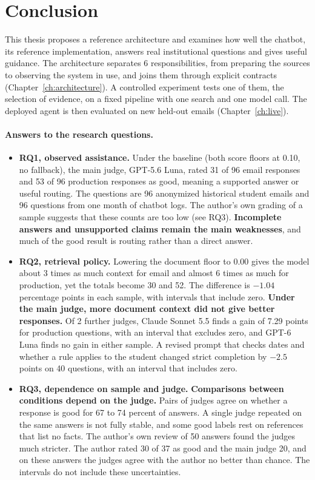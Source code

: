 \section{Conclusion}
\label{ch:conclusion}

This thesis proposes a reference architecture and examines how well the chatbot, its reference implementation, answers real institutional questions and gives useful guidance. The architecture separates 6 responsibilities, from preparing the sources to observing the system in use, and joins them through explicit contracts (Chapter~\ref{ch:architecture}). A controlled experiment tests one of them, the selection of evidence, on a fixed pipeline with one search and one model call. The deployed agent is then evaluated on new held-out emails (Chapter~\ref{ch:live}).

\paragraph{Answers to the research questions.}
\begin{itemize}
  \item \textbf{RQ1, observed assistance.} Under the baseline (both score floors at 0.10, no fallback), the main judge, GPT-5.6 Luna, rated 31 of 96 email responses and 53 of 96 production responses as good, meaning a supported answer or useful routing. The questions are 96 anonymized historical student emails and 96 questions from one month of chatbot logs. The author's own grading of a sample suggests that these counts are too low (see RQ3). \textbf{Incomplete answers and unsupported claims remain the main weaknesses}, and much of the good result is routing rather than a direct answer.
  \item \textbf{RQ2, retrieval policy.} Lowering the document floor to 0.00 gives the model about 3 times as much context for email and almost 6 times as much for production, yet the totals become 30 and 52. The difference is $-1.04$ percentage points in each sample, with intervals that include zero. \textbf{Under the main judge, more document context did not give better responses.} Of 2 further judges, Claude Sonnet 5.5 finds a gain of 7.29 points for production questions, with an interval that excludes zero, and GPT-6 Luna finds no gain in either sample. A revised prompt that checks dates and whether a rule applies to the student changed strict completion by $-2.5$ points on 40 questions, with an interval that includes zero.
  \item \textbf{RQ3, dependence on sample and judge.} \textbf{Comparisons between conditions depend on the judge.} Pairs of judges agree on whether a response is good for 67 to 74 percent of answers. A single judge repeated on the same answers is not fully stable, and some good labels rest on references that list no facts. The author's own review of 50 answers found the judges much stricter. The author rated 30 of 37 as good and the main judge 20, and on these answers the judges agree with the author no better than chance. The intervals do not include these uncertainties.
\end{itemize}

